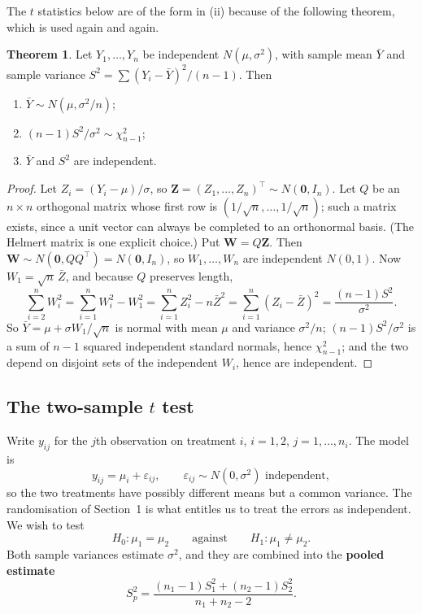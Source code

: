 \documentclass[11pt,a4paper]{article}
\numberwithin{equation}{section}
\theoremstyle{definition}
\newtheorem{thm}{Theorem}[subsection]
\begin{document}
The $t$ statistics below are of the form in (ii) because of the following theorem, which is used again and again.

\begin{thm}\label{thm:normal-sample}
Let $Y_1, \dots, Y_n$ be independent $N(\mu, \sigma^2)$, with sample mean $\bar Y$ and sample variance $S^2 = \sum(Y_i - \bar Y)^2/(n - 1)$. Then
\begin{enumerate}[label=(\roman*)]
\item $\bar Y \sim N(\mu, \sigma^2/n)$;
\item $(n - 1)S^2/\sigma^2 \sim \chi^2_{n-1}$;
\item $\bar Y$ and $S^2$ are independent.
\end{enumerate}
\end{thm}

\begin{proof}
Let $Z_i = (Y_i - \mu)/\sigma$, so $\mathbf Z = (Z_1, \dots, Z_n)^\top \sim N(\mathbf 0, I_n)$. Let $Q$ be an $n \times n$ orthogonal matrix whose first row is
$(1/\sqrt n, \dots, 1/\sqrt n)$; such a matrix exists, since a unit vector can always be completed to an orthonormal basis. (The Helmert matrix is one
explicit choice.) Put $\mathbf W = Q\mathbf Z$. Then $\mathbf W \sim N(\mathbf 0, QQ^\top) = N(\mathbf 0, I_n)$, so $W_1, \dots, W_n$ are independent $N(0, 1)$. Now
$W_1 = \sqrt n\,\bar Z$, and because $Q$ preserves length,
\[
\sum_{i=2}^nW_i^2 = \sum_{i=1}^nW_i^2 - W_1^2 = \sum_{i=1}^nZ_i^2 - n\bar Z^2 = \sum_{i=1}^n(Z_i - \bar Z)^2 = \frac{(n - 1)S^2}{\sigma^2} .
\]
So $\bar Y = \mu + \sigma W_1/\sqrt n$ is normal with mean $\mu$ and variance $\sigma^2/n$; $(n - 1)S^2/\sigma^2$ is a sum of $n - 1$ squared independent
standard normals, hence $\chi^2_{n-1}$; and the two depend on disjoint sets of the independent $W_i$, hence are independent.
\end{proof}

\subsection{The two-sample $t$ test}
Write $y_{ij}$ for the $j$th observation on treatment $i$, $i = 1, 2$, $j = 1, \dots, n_i$. The model is
\[
y_{ij} = \mu_i + \varepsilon_{ij} , \qquad \varepsilon_{ij} \sim N(0, \sigma^2) \text{ independent} ,
\]
so the two treatments have possibly different means but a common variance. The randomisation of Section~1 is what entitles us to treat the
errors as independent. We wish to test
\[
H_0 : \mu_1 = \mu_2 \qquad\text{against}\qquad H_1 : \mu_1 \ne \mu_2 .
\]
Both sample variances estimate $\sigma^2$, and they are combined into the \textbf{pooled estimate}
\[
S_p^2 = \frac{(n_1 - 1)S_1^2 + (n_2 - 1)S_2^2}{n_1 + n_2 - 2} .
\]
\end{document}
